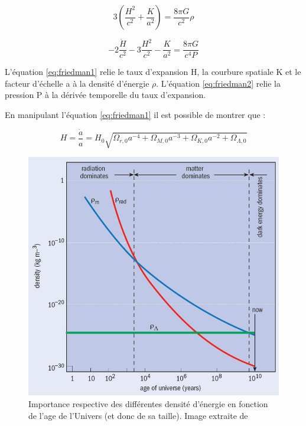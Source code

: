 
\begin{equation}
3 \left( \frac{H^2}{c^2} +\frac{K}{a^2} \right) = \frac{8 \pi G }{c^2} \rho
\label{eq:friedman1}
\end{equation}

\begin{equation}
-2 \frac{ \dot{H}}{c^2} -3 \frac{H^2}{c^2} -\frac{K}{a^2} = \frac{8 \pi G }{c^4 P}
\label{eq:friedman2}
\end{equation}

L'équation \ref{eq:friedman1} relie le taux d'expansion H, la courbure spatiale K et le facteur d'échelle a à la densité d'énergie $\rho$.
L'équation \ref{eq:friedman2} relie la pression P à la dérivée temporelle du taux d'expansion.
 
  
En manipulant l'équation \ref{eq:friedman1} il est possible de montrer que :


\begin{equation}
H = \frac{\dot{a}}{a} = H_0 \sqrt{ \Omega_{r,0} a^{-4} +  \Omega_{M,0} a^{-3} + \Omega_{K,0}a^{-2} + \Omega_{\Lambda,0}  } 
\label{eq:scale_t}
\end{equation}


\begin{figure}[bth]
        \includegraphics[width=.9\linewidth]{img/01/dark4.jpg} 
        \caption[Densités d'énergies]{Importance respective des différentes densité d'énergie en fonction de l'age de l'Univers (et donc de sa taille). Image extraite de \citep{2005univ.book.....F}
 		\label{fig:cosmoparamt} }
\end{figure}


